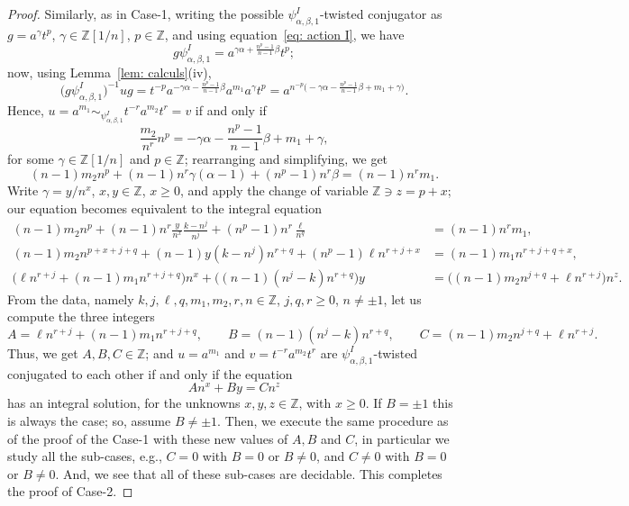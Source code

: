 \documentclass[a4paper]{amsart}
\theoremstyle{definition}
\newcommand\ZZ{\mathbb{Z}}
\begin{document}
\begin{proof}
Similarly, as in Case-1, writing the possible $\psi^I_{\alpha, \beta, 1}$-twisted conjugator as $g=a^{\gamma}t^p$, $\gamma\in \ZZ[1/n]$, $p\in \ZZ$, and using equation~\eqref{eq: action I}, we have 
 \[
g\psi^I_{\alpha,\beta, 1} =a^{\gamma \alpha + \frac{n^{p}-1}{n-1}\beta}t^{p}; 
\] 
now, using Lemma~\ref{lem: calculs}(iv),  
 \[
\big( g\psi^I_{\alpha,\beta, 1} \big)^{-1} ug=t^{-p} a^{-\gamma \alpha - \frac{n^{p}-1}{n-1}\beta} a^{m_1} a^{\gamma}t^p= a^{n^{-p}\big(-\gamma \alpha -\frac{n^p-1}{n-1}\beta +m_1 +\gamma \big)}.
 \]
Hence, $u=a^{m_1}\sim_{\psi^I_{\alpha, \beta, 1}} t^{-r}a^{m_2}t^r =v$ if and only if 
 \[
\frac{m_2}{n^{r}} n^p =-\gamma \alpha -\frac{n^{p}-1}{n-1}\beta +m_1 +\gamma, 
 \]
for some $\gamma \in \ZZ[1/n]$ and $p\in \ZZ$; rearranging and simplifying, we get
 \[
(n-1)m_2 n^p +(n-1)n^{r}\gamma (\alpha -1) +(n^{p}-1)n^{r}\beta =(n-1)n^{r}m_1.
 \]
Write $\gamma =y/n^x$, $x,y\in \ZZ$, $x\geq 0$, and apply the change of variable $\ZZ \ni z=p+x$; our equation becomes equivalent to the integral equation  
\begin{align*}
 (n-1)m_2 n^p +(n-1)n^{r}\frac{y}{n^x} \frac{k-n^j}{n^j} +(n^{p}-1)n^{r}\frac{\ell}{n^q} & =(n-1)n^{r}m_1,\\ 
 (n-1)m_2 n^{p+x+j+q} +(n-1)y(k-n^j)n^{r+q} +(n^{p}-1)\ell n^{r+j+x} &=(n-1)m_1 n^{r+j+q+x},\\
\Big( \ell n^{r+j}+(n-1)m_1 n^{r+j+q}\Big) n^x +\Big( (n-1)(n^j-k)n^{r+q} \Big) y &=\Big( (n-1)m_2 n^{j+q} +\ell n^{r+j}\Big) n^{z}. 
\end{align*}
% 
From the data, namely $k, j, \ell, q, m_1, m_2, r, n\in \ZZ$, $j,q,r\geq 0$, $n\neq \pm 1$, let us compute the three integers 
 \[
A=\ell n^{r+j}+(n-1)m_1 n^{r+j+q},\qquad B=(n-1)(n^j-k)n^{r+q}, \qquad C=(n-1)m_2 n^{j+q}+\ell n^{r+j}.
 \]
Thus, we get  $A,B,C\in \ZZ$; and $u=a^{m_1}$ and $v=t^{-r}a^{m_2}t^r$ are $\psi^I_{\alpha, \beta, 1}$-twisted conjugated to each other if and only if the equation 
 \begin{equation}\label{eq: equation-I 1}
An^x +By=Cn^z
 \end{equation}
has an integral solution, for the unknowns $x,y,z\in \ZZ$, with $x\geq 0$. If $B=\pm 1$ this is always the case; so, assume $B\neq \pm 1$. Then, we execute the same procedure as of the proof of the Case-1 with these new values of $A, B$ and $C$, in particular we study all the sub-cases, e.g., $C=0$ with $B = 0$ or $B \neq 0$, and $C \neq 0$ with $B = 0$ or $B \neq 0$. And, we see that all of these sub-cases are decidable. This completes the proof of Case-2. 
\end{proof}
\end{document}
